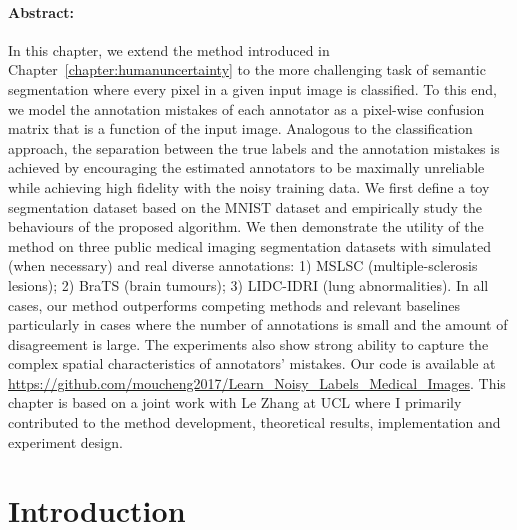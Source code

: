 \paragraph{Abstract: }
In this chapter, we extend the method introduced in Chapter~\ref{chapter:humanuncertainty} to the more challenging task of semantic segmentation where every pixel in a given input image is classified. To this end, we model the annotation mistakes of each annotator as a pixel-wise confusion matrix that is a function of the input image. Analogous to the classification approach, the separation between the true labels and the annotation mistakes is achieved by encouraging the estimated annotators to be maximally unreliable while achieving high fidelity with the noisy training data. We first define a toy segmentation dataset based on the MNIST dataset and empirically study the behaviours of the proposed algorithm. We then demonstrate the utility of the method on three public medical imaging segmentation datasets with simulated (when necessary) and real diverse annotations: 1) MSLSC (multiple-sclerosis lesions); 2) BraTS (brain tumours); 3) LIDC-IDRI (lung abnormalities). In all cases, our method outperforms competing methods and relevant baselines particularly in cases where the number of annotations is small and the amount of disagreement is large. The experiments also show strong ability to capture the complex spatial characteristics of annotators' mistakes. Our code is available at \url{https://github.com/moucheng2017/Learn_Noisy_Labels_Medical_Images}. This chapter is based on a joint work \cite{zhang2020disentangling} with Le Zhang at UCL where I primarily contributed to the method development, theoretical results, implementation and experiment design. 

\section{Introduction}




